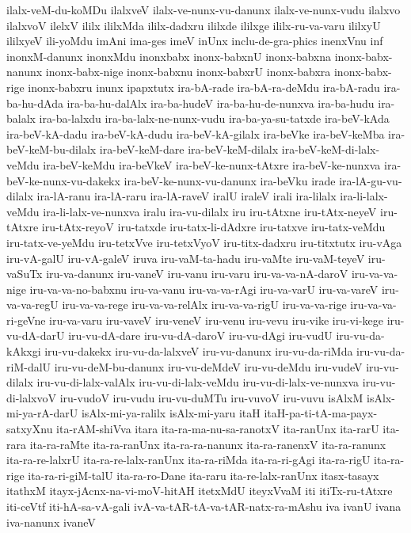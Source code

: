 {ilalx-veM-du-koMDu
ilalxveV
ilalx-ve-nunx-vu-danunx
ilalx-ve-nunx-vudu
ilalxvo
ilalxvoV
ilelxV
ililx
ililxMda
ililx-dadxru
ililxde
ililxge
ililx-ru-va-varu
ililxyU
ililxyeV
ili-yoMdu
imAni
ima-ges
imeV
inUnx
inclu-de-gra-phics
inenxVnu
inf
inonxM-danunx
inonxMdu
inonxbabx
inonx-babxnU
inonx-babxna
inonx-babx-nanunx
inonx-babx-nige
inonx-babxnu
inonx-babxrU
inonx-babxra
inonx-babx-rige
inonx-babxru
inunx
ipapxtutx
ira-bA-rade
ira-bA-ra-deMdu
ira-bA-radu
ira-ba-hu-dAda
ira-ba-hu-dalAlx
ira-ba-hudeV
ira-ba-hu-de-nunxva
ira-ba-hudu
ira-balalx
ira-ba-lalxdu
ira-ba-lalx-ne-nunx-vudu
ira-ba-ya-su-tatxde
ira-beV-kAda
ira-beV-kA-dadu
ira-beV-kA-dudu
ira-beV-kA-gilalx
ira-beVke
ira-beV-keMba
ira-beV-keM-bu-dilalx
ira-beV-keM-dare
ira-beV-keM-dilalx
ira-beV-keM-di-lalx-veMdu
ira-beV-keMdu
ira-beVkeV
ira-beV-ke-nunx-tAtxre
ira-beV-ke-nunxva
ira-beV-ke-nunx-vu-dakekx
ira-beV-ke-nunx-vu-danunx
ira-beVku
irade
ira-lA-gu-vu-dilalx
ira-lA-ranu
ira-lA-raru
ira-lA-raveV
iralU
iraleV
irali
ira-lilalx
ira-li-lalx-veMdu
ira-li-lalx-ve-nunxva
iralu
ira-vu-dilalx
iru
iru-tAtxne
iru-tAtx-neyeV
iru-tAtxre
iru-tAtx-reyoV
iru-tatxde
iru-tatx-li-dAdxre
iru-tatxve
iru-tatx-veMdu
iru-tatx-ve-yeMdu
iru-tetxVve
iru-tetxVyoV
iru-titx-dadxru
iru-titxtutx
iru-vAga
iru-vA-galU
iru-vA-galeV
iruva
iru-vaM-ta-hadu
iru-vaMte
iru-vaM-teyeV
iru-vaSuTx
iru-va-danunx
iru-vaneV
iru-vanu
iru-varu
iru-va-va-nA-daroV
iru-va-va-nige
iru-va-va-no-babxnu
iru-va-vanu
iru-va-va-rAgi
iru-va-varU
iru-va-vareV
iru-va-va-regU
iru-va-va-rege
iru-va-va-relAlx
iru-va-va-rigU
iru-va-va-rige
iru-va-va-ri-geVne
iru-va-varu
iru-vaveV
iru-veneV
iru-venu
iru-vevu
iru-vike
iru-vi-kege
iru-vu-dA-darU
iru-vu-dA-dare
iru-vu-dA-daroV
iru-vu-dAgi
iru-vudU
iru-vu-da-kAkxgi
iru-vu-dakekx
iru-vu-da-lalxveV
iru-vu-danunx
iru-vu-da-riMda
iru-vu-da-riM-dalU
iru-vu-deM-bu-danunx
iru-vu-deMdeV
iru-vu-deMdu
iru-vudeV
iru-vu-dilalx
iru-vu-di-lalx-valAlx
iru-vu-di-lalx-veMdu
iru-vu-di-lalx-ve-nunxva
iru-vu-di-lalxvoV
iru-vudoV
iru-vudu
iru-vu-duMTu
iru-vuvoV
iru-vuvu
isAlxM
isAlx-mi-ya-rA-darU
isAlx-mi-ya-ralilx
isAlx-mi-yaru
itaH
itaH-pa-ti-tA-ma-payx-satxyXnu
ita-rAM-shiVva
itara
ita-ra-ma-nu-sa-ranotxV
ita-ranUnx
ita-rarU
ita-rara
ita-ra-raMte
ita-ra-ranUnx
ita-ra-ra-nanunx
ita-ra-ranenxV
ita-ra-ranunx
ita-ra-re-lalxrU
ita-ra-re-lalx-ranUnx
ita-ra-riMda
ita-ra-ri-gAgi
ita-ra-rigU
ita-ra-rige
ita-ra-ri-giM-talU
ita-ra-ro-Dane
ita-raru
ita-re-lalx-ranUnx
itasx-tasayx
itathxM
itayx-jAcnx-na-vi-moV-hitAH
itetxMdU
iteyxVvaM
iti
itiTx-ru-tAtxre
iti-ceVtf
iti-hA-sa-vA-gali
ivA-va-tAR-tA-va-tAR-natx-ra-mAshu
iva
ivanU
ivana
iva-nanunx
ivaneV
}

